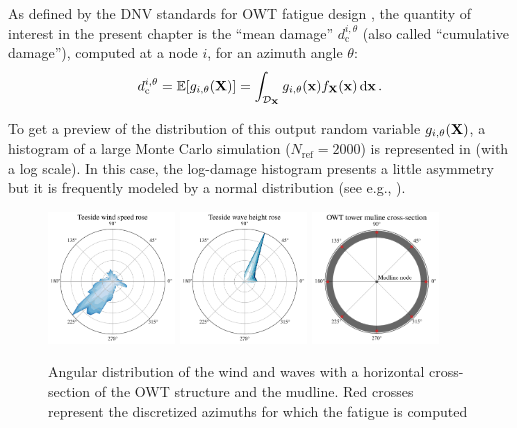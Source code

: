 As defined by the DNV standards for OWT fatigue design \citep{dnv_fatigue_2016}, the quantity of interest in the present chapter is the ``mean damage'' $d_{\mathrm{c}}^{i, \theta}$ (also called ``cumulative damage''), computed at a node $i$, for an azimuth angle $\theta$:
\begin{equation}
    d_{\mathrm{c}}^{i, \theta} = \mathbb{E}[g_{i, \theta}({\bf X})] = \int_{\mathcal{D}_{\bf X}} g_{i, \theta}({\bf x}) f_{{\bf X}}({\bf x})\, \mathrm{d} {\bf x} \,.
    \label{eq:mean_integral}
\end{equation}

To get a preview of the distribution of this output random variable $g_{i, \theta}({\bf X})$, a histogram of a large Monte Carlo simulation ($N_{\mathrm{ref}}=2000$) is represented in  (with a log scale). 
In this case, the log-damage histogram presents a little asymmetry but it is frequently modeled by a normal distribution (see e.g., \citet{teixeira_2019}). 

\begin{figure}[!h]
\begin{center}
    \includegraphics[width=0.3\textwidth]{part2/figures/DCE/teesside/teeside_wind_rose.pdf} \quad
    \includegraphics[width=0.3\textwidth]{part2/figures/DCE/teesside/teeside_wave_rose.pdf} \quad
    \includegraphics[width=0.3\textwidth]{part2/figures/DCE/teesside/mudline_crossection.pdf}
\end{center}
\caption{Angular distribution of the wind and waves with a horizontal cross-section of the OWT structure and the mudline. 
Red crosses represent the discretized azimuths for which the fatigue is computed}
\label{fig:wind_wave_roses}
\end{figure}


